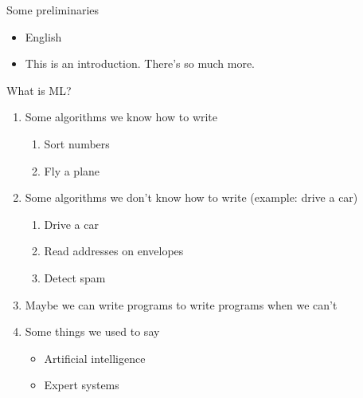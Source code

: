




Some preliminaries
\begin{itemize}
\item English
\item This is an introduction.  There's so much more.
\end{itemize}

What is ML?
\begin{enumerate}
\item Some algorithms we know how to write
  \begin{enumerate}
  \item Sort numbers
  \item Fly a plane
  \end{enumerate}
\item Some algorithms we don't know how to write (example: drive a car)
  \begin{enumerate}
  \item Drive a car 
  \item Read addresses on envelopes
  \item Detect spam
  \end{enumerate}
\item Maybe we can write programs to write programs when we can't
\item Some things we used to say
  \begin{itemize}
  \item Artificial intelligence
  \item Expert systems
  \end{itemize}
\end{enumerate}

